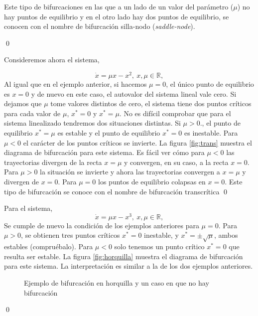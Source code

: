 \begin{example}
Este tipo de bifurcaciones en las que a un lado de un valor del parámetro ($\mu$) no hay puntos de equilibrio y en el otro lado hay dos puntos de equilibrio, se conocen con el nombre de bifurcación silla-nodo (\emph{saddle-node}).  

\qed
\end{example}

\begin{example} Consideremos ahora el sistema,

\begin{equation*}
\dot x = \mu x - x^2,\  x, \mu \in \mathbb{R},  
\end{equation*}
Al igual que en el ejemplo anterior, si hacemos $\mu=0$, el único punto de equilibrio es $x=0$ y de nuevo en este caso, el autovalor del sistema lineal vale cero. Si dejamos que $\mu$ tome valores distintos de cero, el sistema tiene dos puntos críticos para cada valor de $\mu$, $x^*=0$ y $x^*=\mu$. No es difícil comprobar que para el sistema linealizado tendremos dos situaciones distintas. Si $\mu>0$., el punto de equilibrio $x^*=\mu$ es estable y el punto de equilibrio $x^*=0$ es inestable. Para $\mu<0$ el carácter de los puntos críticos se invierte. La figura \ref{fig:trans} muestra el diagrama de bifurcación para este sistema.  Es fácil ver cómo para $\mu<0$ las trayectorias divergen de la recta $x=\mu$ y convergen, en su caso, a la recta $x=0$. Para $\mu>0$ la situación se invierte y ahora las trayectorias convergen a $x=\mu$ y divergen de $x=0$. Para $\mu=0$ los puntos de equilibrio colapsas en $x=0$. Este tipo de bifurcación se conoce con el nombre de bifurcación transcrítica
\qed
\end{example}
 
\begin{example}
Para el sistema,
\begin{equation*}
\dot x = \mu x - x^3,\  x, \mu \in \mathbb{R},  
\end{equation*}
Se cumple de nuevo la condición de los ejemplos anteriores para $\mu=0$. Para $\mu>0$, se obtienen tres puntos críticos $x^*=0$ inestable, y $x^*=\pm\sqrt{\mu}$, ambos estables (compruébalo). Para $\mu<0$ solo tenemos un punto crítico $x^*=0$ que resulta ser estable. La figura \ref{fig:horquilla} muestra el diagrama de bifurcación para este sistema. La interpretación es similar a la de los dos ejemplos anteriores.
\begin{figure}

\caption{Ejemplo de bifurcación en horquilla y un caso en que no hay bifurcación}
\end{figure}

\qed
\end{example}
 
